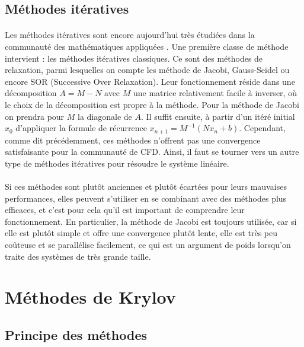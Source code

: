 	\subsection{Méthodes itératives}

		\paragraph{}
		Les méthodes itératives sont encore aujourd'hui très étudiées dans la communauté des mathématiques appliquées \cite{OlshanskiiTyrtyshnikov2014, Saad2003, TrefethenBau1997}.
		Une première classe de méthode intervient : les méthodes itératives classiques.
		Ce sont des méthodes de relaxation, parmi lesquelles on compte les méthode de Jacobi, Gauss-Seidel ou encore SOR (Successive Over Relaxation).
		Leur fonctionnement réside dans une décomposition $A = M - N$ avec $M$ une matrice relativement facile à inverser, où le choix de la décomposition est propre à la méthode.
		Pour la méthode de Jacobi on prendra pour $M$ la diagonale de $A$.
		Il suffit ensuite, à partir d'un itéré initial $x_0$ d'appliquer la formule de récurrence $x_{n+1} = M^{-1}\left(Nx_n + b\right)$.
		Cependant, comme dit précédemment, ces méthodes n'offrent pas une convergence satisfaisante pour la communauté de CFD.
		Ainsi, il faut se tourner vers un autre type de méthodes itératives pour résoudre le système linéaire.

		\paragraph{}
		Si ces méthodes sont plutôt anciennes et plutôt écartées pour leurs mauvaises performances, elles peuvent s'utiliser en se combinant avec des 	méthodes plus efficaces, et c'est pour cela qu'il est important de comprendre leur fonctionnement.
		En particulier, la méthode de Jacobi est toujours utilisée, car si elle est plutôt simple et offre une convergence plutôt lente, elle est très peu coûteuse et se parallélise facilement, ce qui est un argument de poids lorsqu'on traite des systèmes de très grande taille.


\section{Méthodes de Krylov}

  \subsection{Principe des méthodes}

